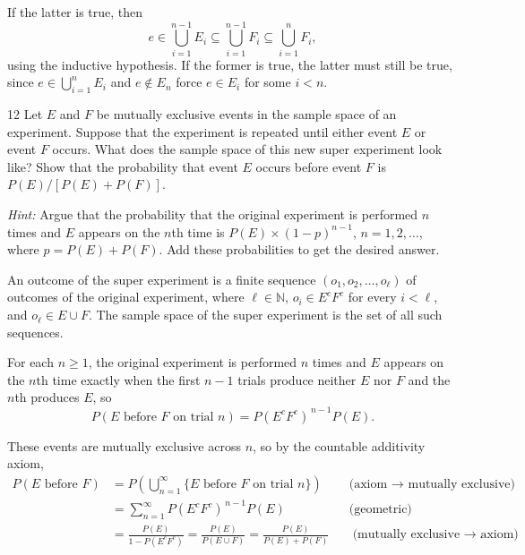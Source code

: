 \documentclass[11pt]{article}
\begin{document}
\smallskip
\noindent If the latter is true, then
\[
  e \in \bigcup_{i=1}^{n-1} E_i \subseteq \bigcup_{i=1}^{n-1} F_i
  \subseteq \bigcup_{i=1}^{n} F_i ,
\]
using the inductive hypothesis. If the former is true, the latter must still be true,
since $e \in \bigcup_{i=1}^{n} E_i$ and $e \notin E_n$ force $e \in E_i$ for some
$i < n$.

\begin{problem}{12}
  Let $E$ and $F$ be mutually exclusive events in the sample space of an
  experiment. Suppose that the experiment is repeated until either event $E$ or
  event $F$ occurs. What does the sample space of this new super experiment look
  like? Show that the probability that event $E$ occurs before event $F$ is
  $P(E) / [P(E) + P(F)]$.

  \upshape\emph{Hint:} Argue that the probability that the original experiment is
  performed $n$ times and $E$ appears on the $n$th time is
  $P(E) \times (1-p)^{n-1}$, $n = 1, 2, \ldots$, where $p = P(E) + P(F)$. Add
  these probabilities to get the desired answer.
\end{problem}
An outcome of the super experiment is a finite sequence $(o_1, o_2, \dots,
o_\ell)$ of outcomes of the original experiment, where $\ell \in \mathbb{N}$,
$o_i \in E^{c}F^{c}$ for every $i < \ell$, and $o_\ell \in E \cup F$. The sample
space of the super experiment is the set of all such sequences.

For each $n \geqslant 1$, the original experiment is performed $n$ times and $E$
appears on the $n$th time exactly when the first $n-1$ trials produce neither $E$
nor $F$ and the $n$th produces $E$, so
\[
  P(\text{$E$ before $F$ on trial $n$}) = P(E^{c}F^{c})^{\,n-1} P(E) .
\]

These events are mutually exclusive across $n$, so by the countable additivity
axiom,
\begin{align*}
  P(\text{$E$ before $F$})
    &= P\!\left( \bigcup_{n=1}^{\infty} \{\text{$E$ before $F$ on trial $n$}\} \right)
      && \text{(axiom $\to$ mutually exclusive)} \\
    &= \sum_{n=1}^{\infty} P(E^{c}F^{c})^{\,n-1} P(E)
      && \text{(geometric)} \\
    &= \frac{P(E)}{1 - P(E^{c}F^{c})}
      = \frac{P(E)}{P(E \cup F)}
      = \frac{P(E)}{P(E) + P(F)}
      && \text{(mutually exclusive $\to$ axiom)} .
\end{align*}
\end{document}
